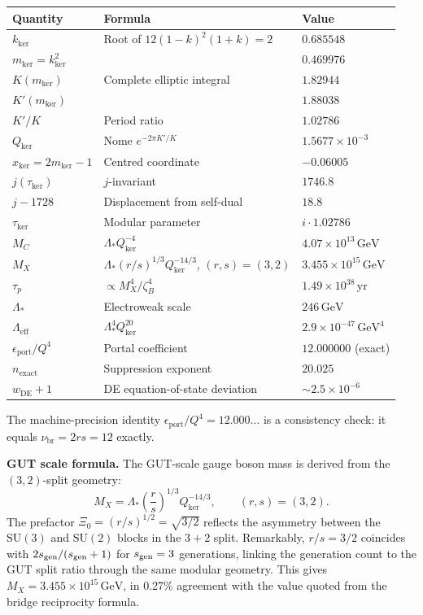 \documentclass[12pt]{article}
\theoremstyle{plain}
\theoremstyle{definition}
\numberwithin{equation}{section}
\newcommand{\br}{\mathrm{br}}
\newcommand{\kker}{\mathrm{ker}}
\begin{document}
\begin{center}
\begin{tabular}{lll}
\toprule
Quantity & Formula & Value\\
\midrule
$k_{\kker}$ & Root of $12(1-k)^2(1+k)=2$ & $0.685548$\\
$m_{\kker}=k_{\kker}^2$ & & $0.469976$\\
$K(m_{\kker})$ & Complete elliptic integral & $1.82944$\\
$K'(m_{\kker})$ & & $1.88038$\\
$K'/K$ & Period ratio & $1.02786$\\
$Q_{\kker}$ & Nome $e^{-2\pi K'/K}$ & $1.5677\times 10^{-3}$\\
$x_{\kker}=2m_{\kker}-1$ & Centred coordinate & $-0.06005$\\
$j(\tau_{\kker})$ & $j$-invariant & $1746.8$\\
$j-1728$ & Displacement from self-dual & $18.8$\\
$\tau_{\kker}$ & Modular parameter & $i\cdot 1.02786$\\
\midrule
$M_C$ & $\Lambda_* Q_{\kker}^{-4}$ & $4.07\times 10^{13}\,\mathrm{GeV}$\\
$M_X$ & $\Lambda_*(r/s)^{1/3}Q_{\kker}^{-14/3}$, $(r,s)=(3,2)$ & $3.455\times 10^{15}\,\mathrm{GeV}$\\
$\tau_p$ & $\propto M_X^4/\zeta_B^4$ & $1.49\times 10^{38}\,\mathrm{yr}$\\
$\Lambda_*$ & Electroweak scale & $246\,\mathrm{GeV}$\\
$\Lambda_{\mathrm{eff}}$ & $\Lambda_*^4 Q_{\kker}^{20}$ & $2.9\times 10^{-47}\,\mathrm{GeV}^4$\\
$\epsilon_{\mathrm{port}}/Q^4$ & Portal coefficient & $12.000000$ (exact)\\
$n_{\mathrm{exact}}$ & Suppression exponent & $20.025$\\
$w_{\mathrm{DE}}+1$ & DE equation-of-state deviation & $\sim 2.5\times 10^{-6}$\\
\bottomrule
\end{tabular}
\end{center}

The machine-precision identity $\epsilon_{\mathrm{port}}/Q^4=12.000\ldots$ is a consistency check: it equals $\nu_{\br}=2rs=12$ exactly.

\medskip

\noindent\textbf{GUT scale formula.}  The GUT-scale gauge boson mass is derived from the $(3,2)$-split geometry:
\begin{equation}
M_X = \Lambda_*\left(\frac{r}{s}\right)^{1/3}Q_{\kker}^{-14/3}, \qquad (r,s)=(3,2).
\end{equation}
The prefactor $\Xi_0=(r/s)^{1/2}=\sqrt{3/2}$ reflects the asymmetry between the $\mathrm{SU}(3)$ and $\mathrm{SU}(2)$ blocks in the $3+2$ split.  Remarkably, $r/s=3/2$ coincides with $2s_{\rm gen}/(s_{\rm gen}+1)$ for $s_{\rm gen}=3$ generations, linking the generation count to the GUT split ratio through the same modular geometry.  This gives $M_X=3.455\times10^{15}\,\mathrm{GeV}$, in 0.27\% agreement with the value quoted from the bridge reciprocity formula.
\end{document}
